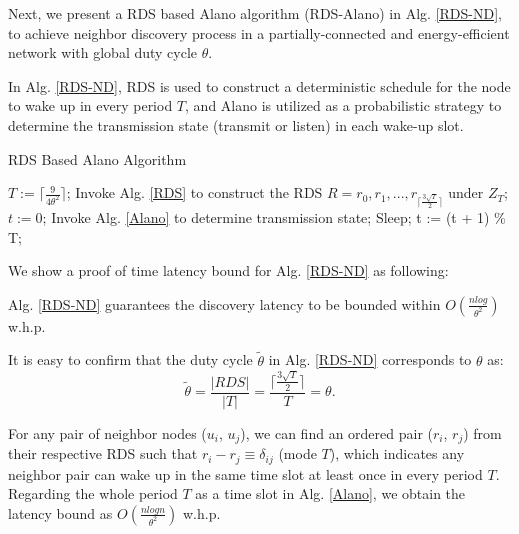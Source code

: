 
Next, we present a RDS based Alano algorithm (RDS-Alano) in Alg. \ref{RDS-ND},
to achieve neighbor discovery process in a partially-connected
and energy-efficient network with global duty cycle $\theta$. 

In Alg. \ref{RDS-ND}, RDS is used to construct a deterministic 
schedule for the node to wake up in every period $T$, 
and Alano is utilized as a probabilistic strategy to 
determine the transmission state (transmit or listen)
in each wake-up slot.

\begin{algorithm}
\caption{RDS Based Alano Algorithm}
\label{RDS-ND}
\begin{algorithmic}[1]
\STATE $T := \lceil \frac{9}{4\theta^{2}} \rceil$;
\STATE Invoke Alg. \ref{RDS} to construct the RDS $R = {r_0, r_1, ...,r_{\lceil \frac{3\sqrt{T}}{2}  \rceil}}$ under $Z_T$;
\STATE $t := 0$;
    		\STATE Invoke Alg. \ref{Alano} to determine transmission state;
	\ELSE
    		\STATE Sleep;
	\ENDIF
	\STATE t := (t + 1) \% T;
\ENDWHILE
\end{algorithmic}
\end{algorithm}


We show a proof of time latency bound for Alg. \ref{RDS-ND}  as following:

\begin{theorem}
\label{theoremRDS}
Alg. \ref{RDS-ND} guarantees the discovery latency
to be bounded within $O(\frac{nlog}{\theta^2})$ w.h.p.
\end{theorem}

\begin{IEEEproof}
It is easy to confirm that the duty cycle $\widetilde{\theta}$ in Alg. \ref{RDS-ND} corresponds to $\theta$ as:
$$
\widetilde{\theta} = \frac{|RDS|}{|T|} = \frac{\lceil \frac{3\sqrt{T}}{2}  \rceil}{T} = \theta.
$$

For any pair of neighbor nodes ($u_i$, $u_j$), 
we can find an ordered pair ($r_i$, $r_j$) from their respective RDS
such that $r_i - r_j \equiv \delta_{ij}$ (mode $T$), 
which indicates any neighbor pair can wake up
in the same time slot at least once in every period $T$.
Regarding the whole period $T$ as a time
slot in Alg. \ref{Alano}, we obtain the latency bound as 
$O(\frac{nlogn}{\theta^2})$ w.h.p.


\end{IEEEproof}

